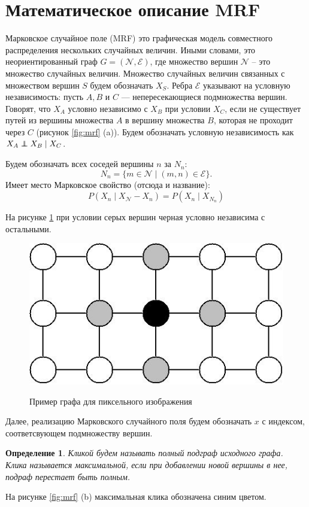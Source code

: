 \documentclass[12pt]{article}
\newcommand\independent{\protect\mathpalette{\protect\independenT}{\perp}}
\def\independenT#1#2{\mathrel{\rlap{$#1#2$}\mkern2mu{#1#2}}}
\newtheorem{dfn}{Определение}
\begin{document}
\section{Математическое описание MRF} 
Марковское случайное поле (MRF) это графическая модель совместного распределения нескольких случайных величин. Иными словами, это неориентированный граф $G = (\mathcal{N}, \mathcal{E})$, где множество вершин $\mathcal{N}$ -- это множество случайных величин. 
Множество случайных величин связанных с множеством вершин $S$ будем обозначать $X_S$. Ребра $\mathcal{E}$ указывают на условную независимость: пусть $A, B$ и $C$ --- непересекающиеся подмножества вершин. Говорят, что $X_A$ условно независимо с $X_B$ при условии $X_C$, если не существует путей из вершины множества $A$ в вершину множества $B$, которая не проходит через $C$ (рисунок \ref{fig:mrf} (a)). Будем обозначать условную независимость как $X_A \independent X_B \mid X_C$.

Будем обозначать всех соседей вершины $n$ за $N_n$: 
\begin{equation*}
N_n = \{ m \in \mathcal{N} \mid (m, n) \in \mathcal{E}\}.
\end{equation*}
Имеет место Марковское свойство (отсюда и название):
\begin{equation*}
P(X_n \mid X_\mathcal{N} - X_n) = P(X_n \mid X_{N_n})
\end{equation*}

На рисунке \ref{fig:example} при условии серых вершин черная условно независима с остальными.

\begin{figure}[hhh]
\centering
\includegraphics[width=.5\linewidth]{figures/blanket.jpg}
\label{fig:example}
\caption{Пример графа для пиксельного изображения}
\end{figure}

Далее, реализацию Марковского случайного поля будем обозначать $x$ с индексом, соответсвующем подмножеству вершин.

\begin{dfn}
Кликой будем называть полный подграф исходного графа. Клика называется максимальной, если при добавлении новой вершины в нее, подраф перестает быть полным.
\end{dfn}
На рисунке \ref{fig:mrf} (b) максимальная клика обозначена синим цветом.
\end{document}
